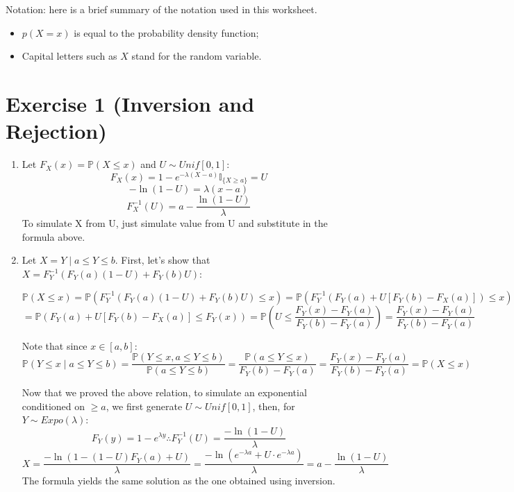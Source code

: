 \documentclass[12pt,letterpaper]{article}
\begin{document}
Notation: here is a brief summary of the notation used in this worksheet.
\begin{itemize}
\item $ p(X=x)$ is equal to the probability density function;
\item Capital letters such as $X$ stand for the random variable.
\end{itemize}

\section*{Exercise 1 (Inversion and Rejection)}
\begin{enumerate}[leftmargin=!,labelindent=5pt]
    \item Let $ F_X(x) = \mathbb{P}(X \leq x) $ and $U \sim Unif[0,1]$:
            $$ F_X(x) = 1 - e^{-\lambda(X-a)}\mathbb{I}_{\{X \geq a\}}=U $$
            $$ -\ln(1-U) = \lambda(x-a) $$
            $$ F_X^{-1}(U) = a - \frac{\ln(1-U)}{\lambda} $$
    To simulate X from U, just simulate value from U and substitute in the
    formula above.
        
    \item Let $X = Y \mid a \leq Y \leq b$.
    First, let's show that $X = F_Y^{-1}(F_Y(a)(1-U)+F_Y(b)U)$:

    $$\mathbb{P}(X \leq x) = \mathbb{P}(F_Y^{-1}(F_Y(a)(1-U)+F_Y(b)U)\leq x)
    = \mathbb{P}(F_Y^{-1}(F_Y(a)+U[F_Y(b)-F_X(a)])\leq x)$$
    $$ = \mathbb{P}(F_Y(a)+U[F_Y(b)-F_X(a)]\leq F_Y(x)) = 
    \mathbb{P}\left(U \leq \frac{F_Y(x) - F_Y(a)}{F_Y(b)-F_Y(a)}\right)
    =\frac{F_Y(x) - F_Y(a)}{F_Y(b)-F_Y(a)}$$

    Note that since $x \in [a,b]$: 
    $$\mathbb{P}(Y \leq x \mid a \leq Y \leq b)
    = \frac{\mathbb{P}(Y \leq x, a \leq Y \leq b)}
    {\mathbb{P}(a \leq Y \leq b)}
    =\frac{\mathbb{P}(a \leq Y \leq x)}{F_Y(b) - F_Y(a)}
    =\frac{F_Y(x) - F_Y(a)}{F_Y(b)-F_Y(a)} = \mathbb{P}(X \leq x)$$

    Now that we proved the above relation, to simulate an exponential
    conditioned on $\geq a$, we first generate $U \sim Unif[0,1]$, then,
    for $Y \sim Expo(\lambda)$:
    $$F_Y(y) = 1 - e^{\lambda y} \therefore F_Y^{-1}(U)
    = \frac{-\ln(1-U)}{\lambda}$$
    $$X = \frac{-\ln(1 - (1-U)F_Y(a)+U)}{\lambda} = 
    \frac{-\ln(e^{-\lambda a}+U\cdot e^{-\lambda a})}{\lambda}
    = a - \frac{\ln(1-U)}{\lambda}
    $$
    The formula yields the same solution as the one obtained using
    inversion.


\end{enumerate}
\end{document}
